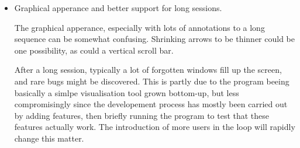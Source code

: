 \begin{itemize}
	\item{Graphical apperance and better support for long sessions.}
		
		The graphical apperance, especially with lots of
		annotations to a long sequence can be somewhat
		confusing. Shrinking arrows to be thinner could be one
		possibility, as could a vertical scroll bar.

		After a long session, typically a lot of forgotten
		windows fill up the screen, and rare bugs might be
		discovered. This is partly due to the program beeing
		basically a simlpe visualisation tool grown bottom-up,
		but less compromisingly since the developement process
		has mostly been carried out by adding features, then
		briefly running the program to test that these
		features actually work. The introduction of more 
		users in the loop will rapidly change this matter.



\end{itemize}
